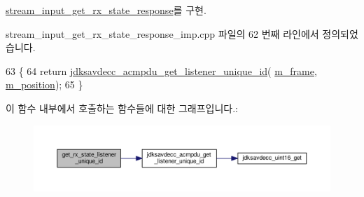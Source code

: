 \hyperlink{classavdecc__lib_1_1stream__input__get__rx__state__response_aa0bccb0d6ad0b1cdad76ad48da795e11}{stream\+\_\+input\+\_\+get\+\_\+rx\+\_\+state\+\_\+response}를 구현.



stream\+\_\+input\+\_\+get\+\_\+rx\+\_\+state\+\_\+response\+\_\+imp.\+cpp 파일의 62 번째 라인에서 정의되었습니다.


\begin{DoxyCode}
63 \{
64     \textcolor{keywordflow}{return} \hyperlink{group__acmpdu_ga36867bfc130619cbea38caa3ce54bc89}{jdksavdecc\_acmpdu\_get\_listener\_unique\_id}(
      \hyperlink{classavdecc__lib_1_1stream__input__get__rx__state__response__imp_a50417969cf438e7c8d698726bbbe2ff9}{m\_frame}, \hyperlink{classavdecc__lib_1_1stream__input__get__rx__state__response__imp_af5e691c4a8a0feb07f48440b321206cd}{m\_position});
65 \}
\end{DoxyCode}


이 함수 내부에서 호출하는 함수들에 대한 그래프입니다.\+:
\nopagebreak
\begin{figure}[H]
\begin{center}
\leavevmode
\includegraphics[width=350pt]{classavdecc__lib_1_1stream__input__get__rx__state__response__imp_a0485733f2f7e1f7644d56e7f47f23fb1_cgraph}
\end{center}
\end{figure}


